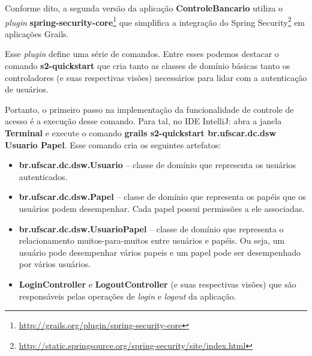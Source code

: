\vspace{0.3cm}

Conforme dito,  a segunda versão  da aplicação {\bf ControleBancario}  utiliza o
{\it                                 plugin}                                {\bf
  spring-security-core}\footnote{\url{http://grails.org/plugin/spring-security-core}}
que          simplifica         a          integração          do         Spring
Security\footnote{\url{http://static.springsource.org/spring-security/site/index.html}}
em aplicações Grails.  

\vspace{0.3cm}

Esse {\it plugin}  define uma série de comandos. Entre  esses podemos destacar o
comando {\bf s2-quickstart}  que cria tanto as classes  de domínio básicas tanto
os  controladores (e  suas  respectivas  visões) necessários  para  lidar com  a
autenticação de usuários. 

\vspace{0.3cm}

Portanto, o  primeiro passo  na implementação da  funcionalidade de  controle de
acesso é  a execução desse  comando.  Para tal,  no IDE IntelliJ: abra  a janela
{\bf Terminal}  e execute o  comando {\bf grails  s2-quickstart br.ufscar.dc.dsw
  Usuario Papel}.  Esse comando cria os seguintes artefatos:

\vspace{0.5cm}

\begin{itemize}

\item  {\bf br.ufscar.dc.dsw.Usuario}  -- classe  de domínio  que  representa os
  usuários autenticados. 

\vspace{0.3cm}

\item {\bf br.ufscar.dc.dsw.Papel} -- classe de domínio que representa os papéis
  que  os  usuários  podem  desempenhar.  Cada papel  possui  permissões  a  ele
  associadas.  

\vspace{0.5cm}

\item {\bf br.ufscar.dc.dsw.UsuarioPapel} --  classe de domínio que representa o
  relacionamento  muitos-para-muitos  entre  usuários  e papéis.   Ou  seja,  um
  usuário pode  desempenhar vários papeis e  um papel pode  ser desempenhado por
  vários usuários. 

\vspace{0.5cm}

\item {\bf LoginController} e {\bf LogoutController} (e suas respectivas visões)
  que  são  responsáveis  pelas operações  de  {\it  login}  e {\it  logout}  da
  aplicação.

\end{itemize}

